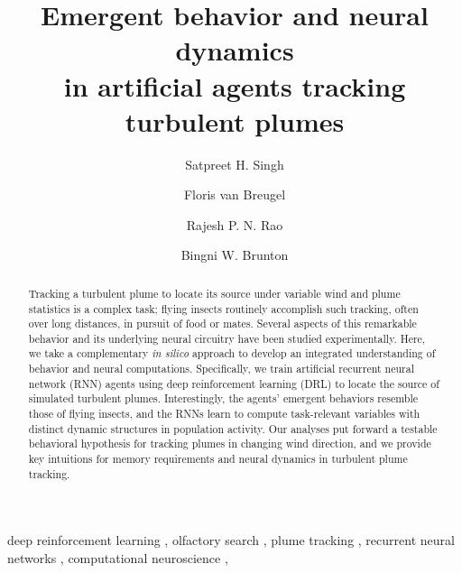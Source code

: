 \documentclass[5p,twocolumn,authoryear]{elsarticle}
\begin{document}
\begin{frontmatter}

\title{
Emergent behavior and neural dynamics \\
in artificial agents tracking turbulent plumes
}

\author[ECE]{Satpreet H. Singh}
\author[UNR]{Floris van Breugel}
\author[CSE,ECE,CNT]{Rajesh P. N. Rao}
\author[Bio,eScience]{Bingni W. Brunton}

\address[ECE]{Department of Electrical and Computer Engineering, University of Washington, Seattle, USA.}
\address[UNR]{Department of Mechanical Engineering, University of Nevada, Reno, USA.}
\address[CSE]{Paul G. Allen School of Computer Science and Engineering, University of Washington, Seattle, USA.}
\address[CNT]{Center for Neurotechnology, University of Washington, Seattle, USA.}
\address[Bio]{Department of Biology, University of Washington, Seattle, USA.}
\address[eScience]{eScience Institute, University of Washington, Seattle, USA.}



\begin{abstract}
\linenumbers
\begin{linenumbers}
Tracking a turbulent plume to locate its source under variable wind and plume statistics is a complex task; flying insects routinely accomplish such tracking, often over long distances, in pursuit of food or mates.
Several aspects of this remarkable behavior and its underlying neural circuitry have been studied experimentally. 
Here, we take a complementary \emph{in silico} approach to develop an integrated understanding of behavior and neural computations.
Specifically, we train artificial recurrent neural network (RNN) agents using deep reinforcement learning (DRL) to locate the source of simulated turbulent plumes.
Interestingly, the agents' emergent behaviors resemble those of flying insects, and the RNNs learn to compute task-relevant variables with distinct dynamic structures in population activity.
Our analyses put forward a testable behavioral hypothesis for tracking plumes in changing wind direction, and we provide key intuitions for memory requirements and neural dynamics in turbulent plume tracking.
\end{linenumbers}
\end{abstract}

\begin{keyword}
deep reinforcement learning \sep 
olfactory search \sep
plume tracking \sep
recurrent neural networks \sep
computational neuroscience \sep 
\end{keyword}
\end{frontmatter}
\end{document}
